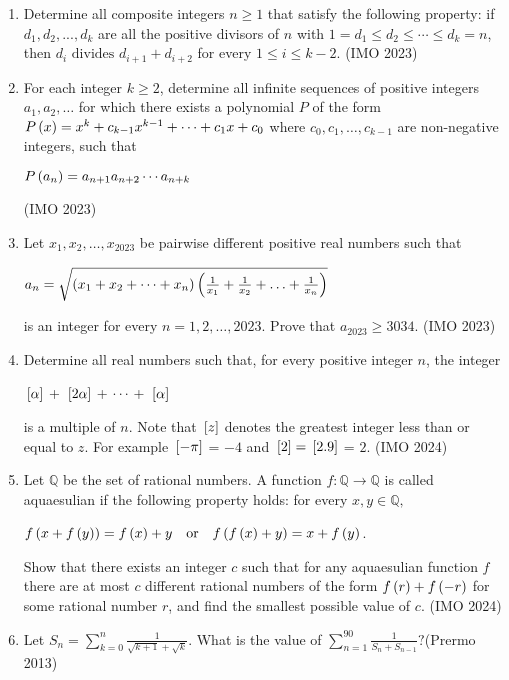\begin{enumerate}
\item
Determine all composite integers  $n \geq 1$  that satisfy the following property: if  $d_{1}, d_{2}, ..., d_{k}$  are all the positive divisors of  $n$  with  $1 = d_{1} \le d_{2} \le \cdots \le d_{k} = n$,  then  $d_{i} \text{ divides } d_{i+1} + d_{i+2}$  for every  $1 \leq i \leq k - 2.$ \hfill(IMO 2023)
\item
 For each integer  $k \geq 2$, determine all infinite sequences of positive integers $a_{1}, a_{2}, \ldots$ for which there exists a polynomial  $P$ of the form $ P\left(x\right) = x^{k} + c_{k-1}x^{k-1} + \cdots + c_{1}x + c_{0}$  where $c_{0}, c_{1}, \ldots, c_{k-1}$  are non-negative integers, such that
\begin{center}
	$P\left(a_{n}\right) = a_{n+1}a_{n+2}\cdots a_{n+k}$
\end{center} \hfill(IMO 2023)
\item
Let $x_{1}, x_{2},\ldots , x_{2023}$  be pairwise different positive real numbers such that 
\begin{center}
$a_{n} = \sqrt{\left(x_{1} + x_{2} + \cdots + x_{n}\right) \left(\frac{1}{x_{1}}+\frac{1}{x_{2}}+\ldots+\frac{1}{x_{n}}\right)}$
\end{center}
 is an integer for every $n = 1, 2,\ldots, 2023.$  Prove that  $a_{2023} \geq 3034$. \hfill(IMO 2023)
\item
Determine all real numbers such that, for every positive integer $n$, the integer 
\begin{center}
${}\left[\alpha\right]$ + ${}\left[2\alpha\right]$ + $\cdot\cdot\cdot$ + ${}\left[\alpha\right]$ 
\end{center}
is a multiple of  $n$.  Note that ${}\left[z\right]$  denotes the greatest integer less than or equal to $z$. For example ${}\left[-\pi\right]$ = $-4$  and  ${}\left[2\right] = {}\left[2.9\right]$ = $2$. \hfill(IMO 2024)
\item
 Let  $\mathbb{Q}$  be the set of rational numbers. A function  $f: \mathbb{Q} \to \mathbb{Q}$  is called aquaesulian if the following property holds: for every  $x, y \in \mathbb{Q},$ 
\begin{center}
$f\left(x + f\left(y\right)\right) = f\left(x\right) + y \quad \text{or} \quad f\left(f\left(x\right) + y\right) = x + f\left(y\right)$.
\end{center}
Show that there exists an integer  $c$  such that for any aquaesulian function  $f$  there are at most  $c$  different rational numbers of the form  $f\left(r\right) + f\left(-r\right)$  for some rational number  $r$,  and find the smallest possible value of  $c$. \hfill(IMO 2024)
\item Let
$ S_n = \sum_{k=0}^{n} \frac{1}{\sqrt{k+1} + \sqrt{k}}. $
What is the value of 
$ \sum_{n=1}^{90} \frac{1}{S_n + S_{n-1}}? $\hfill(Prermo 2013)


\end{enumerate}
